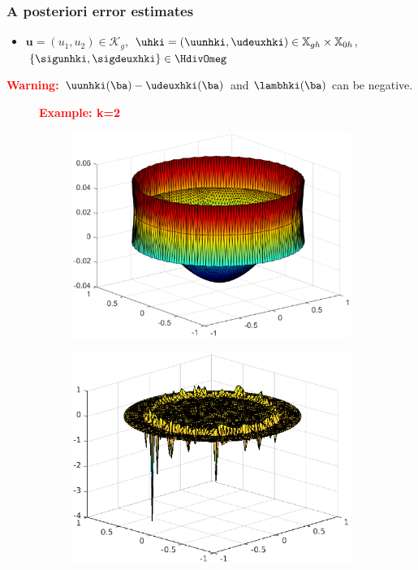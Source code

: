 \documentclass[10 pt]{beamer}
\begin{document}
\begin{frame}
\frametitle{A posteriori error estimates}
\vspace{-0.2 cm}

\begin{itemize}
\item
${\bm u}=(u_1,u_2)\in\mathcal{K}_g$,\ $\uhki=(\uunhki,\udeuxhki)\in \mathbb{X}_{gh} \times \mathbb{X}_{0h}$,\ $\left\{\sigunhki, \sigdeuxhki\right\} \in \HdivOmeg$
\end{itemize}
\textcolor{red}{\textbf{Warning:}}
$\uunhki(\ba) - \udeuxhki(\ba)$ and $\lambhki(\ba)$ can be negative. 
\begin{figure}[H]
\textcolor{red}{\hspace{-1.4 cm} \textbf{Example: k=2}}
\begin{subfigure}[normal]{0.35\textwidth} 
\includegraphics[width=\textwidth]{fig_article/position_membrane_inside_newton_iter_Hmax_015_diff_color.eps}    
\label{ref:position_membrane_inside_iter}
\end{subfigure}
\begin{subfigure}[normal]{0.35\textwidth}
\includegraphics[width=\textwidth]{fig_article/lambda_newton_iter7.eps}     

\end{subfigure}
\end{figure}
\end{frame}
\end{document}
